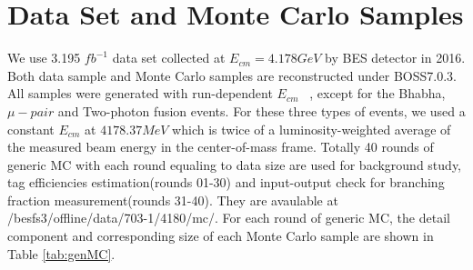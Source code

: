 \section{Data Set and Monte Carlo Samples}
We use 3.195 $fb^{-1}$ data set collected at $E_{cm} = 4.178 GeV$ by BES\uppercase\expandafter{} detector in 2016. Both data sample and Monte Carlo samples are reconstructed under BOSS7.0.3. 
All samples were generated with run-dependent $E_{cm}$ ~\cite{DocDB 580-v1}, except for the Bhabha, $\mu-pair$ and Two-photon fusion events.
For these three types of events, we used a constant $E_{cm}$ at $4178.37MeV$ which is twice of a luminosity-weighted average of the measured beam energy in the center-of-mass frame. 
Totally 40 rounds of generic MC with each round equaling to data size are used for background study, tag efficiencies estimation(rounds 01-30) and input-output check for branching fraction measurement(rounds 31-40). 
They are avaulable at
/besfs3/offline/data/703-1/4180/mc/.
For each round of generic MC, the detail component and corresponding size of each Monte Carlo sample are shown in Table \ref{tab:genMC}.
